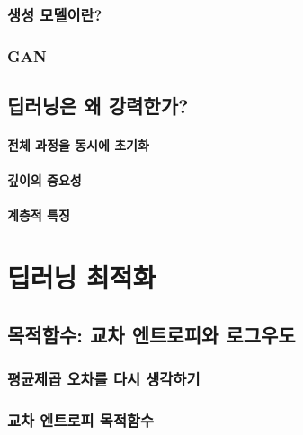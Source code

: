 \documentclass [12pt] {oblivoir}
\let\oldsubsubsection=\subsubsection
\renewcommand{\subsubsection}
{
  \filbreak
  \oldsubsubsection
}
\begin{document}
\subsubsection{생성 모델이란?}

\subsubsection{GAN}

\subsection{딥러닝은 왜 강력한가?}

\paragraph*{전체 과정을 동시에 초기화}\mbox{}

\vspace{3mm}

\paragraph*{깊이의 중요성}\mbox{}

\vspace{3mm}

\paragraph*{계층적 특징}\mbox{}

\vspace{3mm}

\newpage
\section{딥러닝 최적화}

\subsection{목적함수: 교차 엔트로피와 로그우도}

\subsubsection{평균제곱 오차를 다시 생각하기}

\subsubsection{교차 엔트로피 목적함수}
\end{document}
